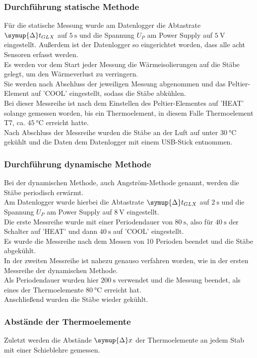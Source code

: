 \subsubsection{Durchführung statische Methode}
Für die statische Messung wurde am Datenlogger die Abtastrate $\symup{\Delta}t_{GLX}$ auf $\SI{5}{\second}$ und die Spannung
$U_P$ am Power Supply auf $\SI{5}{\volt}$ eingestellt. Außerdem ist der Datenlogger so eingerichtet worden, dass alle acht Sensoren
erfasst werden. \\
Es werden vor dem Start jeder Messung die Wärmeisolierungen auf die Stäbe gelegt, um den Wärmeverlust zu verringern.\\
Sie werden nach Abschluss der jeweiligen Messung abgenommen und das Peltier-Element auf 'COOL' eingestellt, sodass die Stäbe abkühlen.\\
Bei dieser Messreihe ist nach dem Einstellen des Peltier-Elementes auf 'HEAT' solange gemessen worden, bis ein Thermoelement, in diesem Falle
Thermoelement T7, ca. $\SI{45}{\celsius}$ erreicht hatte. \\
Nach Abschluss der Messreihe wurden die Stäbe an der Luft
auf unter $\SI{30}{\celsius}$ gekühlt und die Daten dem Datenlogger mit einem USB-Stick entnommen.
\subsubsection{Durchführung dynamische Methode}
Bei der dynamischen Methode, auch Angström-Methode genannt, werden die Stäbe periodisch erwärmt.\\
Am Datenlogger wurde hierbei die Abtastrate $\symup{\Delta}t_{GLX}$ auf $\SI{2}{\second}$
und die Spannung $U_P$ am Power Supply auf $\SI{8}{\volt}$ eingestellt.\\ 
Die erste Messreihe
wurde mit einer Periodendauer von $\SI{80}{\second}$, also für $\SI{40}{\second}$ der Schalter auf 'HEAT' und dann
$\SI{40}{\second}$ auf 'COOL' eingestellt. \\
Es wurde die Messreihe nach dem Messen von 10 Perioden beendet und die Stäbe abgekühlt.\\
In der zweiten Messreihe ist nahezu genauso verfahren worden, wie in der ersten Messreihe der dynamischen Methode. \\
Als Periodendauer wurden hier
$\SI{200}{\second}$ verwendet und die Messung beendet, als eines der Thermoelemente $\SI{80}{\celsius}$ erreicht hat.\\
Anschließend wurden die Stäbe wieder gekühlt.
\subsubsection{Abstände der Thermoelemente}
Zuletzt werden die Abstände $\symup{\Delta}x$ der Thermoelemente an jedem Stab mit einer Schieblehre gemessen.\\